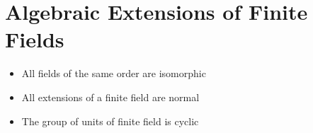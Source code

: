\chapter{Algebraic Extensions of Finite Fields}
\label{FF:Alg:Ext:Chap}

\begin{itemize}
\item All fields of the same order are isomorphic
\item All extensions of a finite field are normal
\item The group of units of finite field is cyclic
\end{itemize}

